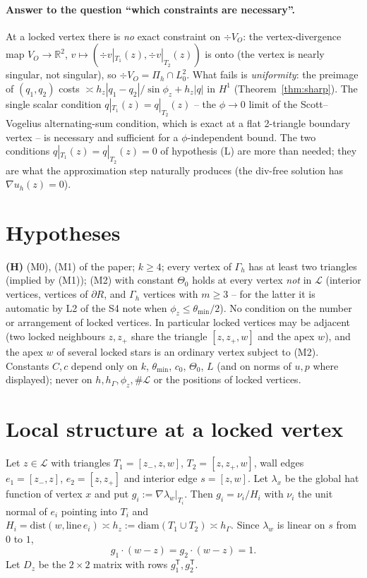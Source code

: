 \documentclass[11pt]{article}
\theoremstyle{remark}
\newcommand{\hG}{h_\Gamma}
\newcommand{\VO}{V_O}
\newcommand{\Pih}{\Pi_h}
\newcommand{\Lk}{\mathcal L}
\begin{document}
\paragraph{Answer to the question ``which constraints are necessary''.}
At a locked vertex there is \emph{no} exact constraint on $\div\VO$: the vertex-divergence map
$\VO\to\mathbb R^2$, $v\mapsto(\div v|_{T_1}(z),\div v|_{T_2}(z))$ is onto (the vertex is nearly singular,
not singular), so $\div\VO=\Pih\cap L^2_0$. What fails is \emph{uniformity}: the preimage of
$(q_1,q_2)$ costs $\asymp h_z|q_1-q_2|/\sin\phi_z+h_z|q|$ in $H^1$ (Theorem~\ref{thm:sharp}). The single
scalar condition $q|_{T_1}(z)=q|_{T_2}(z)$ -- the $\phi\to0$ limit of the Scott--Vogelius alternating-sum
condition, which is exact at a flat 2-triangle boundary vertex -- is necessary and sufficient for a
$\phi$-independent bound. The two conditions $q|_{T_1}(z)=q|_{T_2}(z)=0$ of hypothesis (L) are more
than needed; they are what the approximation step naturally produces (the div-free solution has $\nabla u_h(z)=0$).

\section{Hypotheses}
\textbf{(H)} (M0), (M1) of the paper; $k\ge4$; every vertex of $\Gamma_h$ has at least two triangles
(implied by (M1)); (M2) with constant $\Theta_0$ holds at every vertex \emph{not} in $\Lk$
(interior vertices, vertices of $\partial R$, and $\Gamma_h$ vertices with $m\ge3$ -- for the latter it is
automatic by L2 of the S4 note when $\phi_z\le\theta_{\min}/2$).
No condition on the number or arrangement of locked vertices. In particular locked vertices may be
adjacent (two locked neighbours $z,z_+$ share the triangle $[z,z_+,w]$ and the apex $w$), and the apex $w$ of
several locked stars is an ordinary vertex subject to (M2).
Constants $C,c$ depend only on $k$, $\theta_{\min}$, $c_0$, $\Theta_0$, $L$ (and on norms of $u,p$ where
displayed); never on $h,\hG,\phi_z,\#\Lk$ or the positions of locked vertices.

\section{Local structure at a locked vertex}
Let $z\in\Lk$ with triangles $T_1=[z_-,z,w]$, $T_2=[z,z_+,w]$, wall edges $e_1=[z_-,z]$, $e_2=[z,z_+]$ and
interior edge $s=[z,w]$. Let $\lambda_x$ be the global hat function of vertex $x$ and put
$g_i:=\nabla\lambda_w|_{T_i}$. Then $g_i=\nu_i/H_i$ with $\nu_i$ the unit normal of $e_i$ pointing into
$T_i$ and $H_i=\mathrm{dist}(w,\mathrm{line}\,e_i)\asymp h_z:=\mathrm{diam}(T_1\cup T_2)\asymp\hG$.
Since $\lambda_w$ is linear on $s$ from $0$ to $1$,
\begin{equation}\label{eq:gs}
g_1\cdot(w-z)=g_2\cdot(w-z)=1 .
\end{equation}
Let $D_z$ be the $2\times2$ matrix with rows $g_1^{\mathsf T},g_2^{\mathsf T}$.
\end{document}
